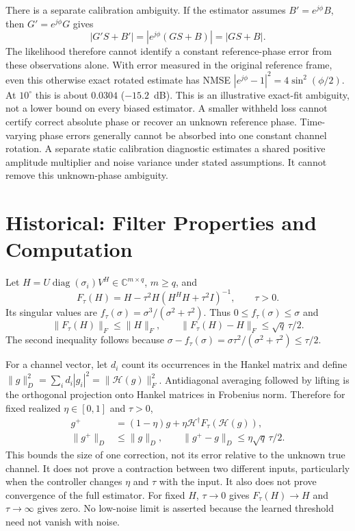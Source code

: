 \documentclass[journal]{IEEEtran}
\newcommand{\Hank}{\mathcal H}
\DeclareMathOperator{\diag}{diag}
\begin{document}
There is a separate calibration ambiguity. If the estimator assumes
$B'=e^{j\phi}B$, then $G'=e^{j\phi}G$ gives
\begin{equation}
 |G'S+B'|=|e^{j\phi}(GS+B)|=|GS+B|.
\end{equation}
The likelihood therefore cannot identify a constant reference-phase error
from these observations alone. With error measured in the original
reference frame, even this otherwise exact rotated estimate has NMSE
$|e^{j\phi}-1|^2=4\sin^2(\phi/2)$. At $10^\circ$ this is about
$0.0304$ ($-15.2$~dB). This is an illustrative exact-fit ambiguity, not
a lower bound on every biased estimator. A smaller withheld loss cannot
certify correct absolute phase or recover an unknown reference phase.
Time-varying phase errors generally cannot be absorbed into one constant
channel rotation. A separate static calibration diagnostic estimates a
shared positive amplitude multiplier and noise variance under stated
assumptions. It cannot remove this unknown-phase ambiguity.

\section{Historical: Filter Properties and Computation}
Let $H=U\diag(\sigma_i)V^H\in\mathbb C^{m\times q}$, $m\ge q$, and
\begin{equation}
 F_\tau(H)=H-\tau^2H(H^HH+\tau^2I)^{-1},\qquad\tau>0.
\end{equation}
Its singular values are $f_\tau(\sigma)=\sigma^3/(\sigma^2+\tau^2)$.
Thus $0\le f_\tau(\sigma)\le\sigma$ and
\begin{equation}
 \|F_\tau(H)\|_F\le\|H\|_F,\qquad
 \|F_\tau(H)-H\|_F\le\sqrt q\,\tau/2.
\end{equation}
The second inequality follows because
$\sigma-f_\tau(\sigma)=\sigma\tau^2/(\sigma^2+\tau^2)\le\tau/2$.

For a channel vector, let $d_i$ count its occurrences in the Hankel
matrix and define $\|g\|_D^2=\sum_i d_i|g_i|^2=\|\Hank(g)\|_F^2$.
Antidiagonal averaging followed by lifting is the orthogonal projection
onto Hankel matrices in Frobenius norm. Therefore for fixed realized
$\eta\in[0,1]$ and $\tau>0$,
\begin{align}
 g^+&=(1-\eta)g+\eta\Hank^\dagger F_\tau(\Hank(g)),\\
 \|g^+\|_D&\le\|g\|_D,\qquad
 \|g^+-g\|_D\le\eta\sqrt q\,\tau/2.
\end{align}
This bounds the size of one correction, not its error relative to the
unknown true channel. It does not prove a contraction between two
different inputs, particularly when the controller changes $\eta$ and
$\tau$ with the input. It also does not prove convergence of the full
estimator. For fixed $H$, $\tau\to0$ gives $F_\tau(H)\to H$ and
$\tau\to\infty$ gives zero. No low-noise limit is asserted because
the learned threshold need not vanish with noise.
\end{document}
